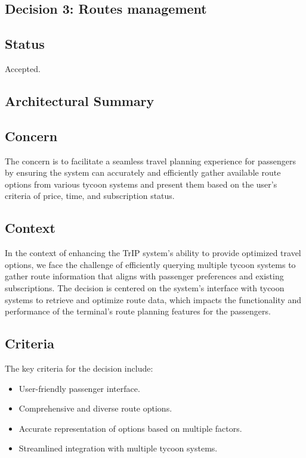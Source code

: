 \subsection{Decision 3: Routes management}

\subsection*{Status}
Accepted.

\subsection*{Architectural Summary}

\subsection*{Concern}
The concern is to facilitate a seamless travel planning experience for passengers by ensuring the system can accurately and efficiently gather available route options from various tycoon systems and present them based on the user's criteria of price, time, and subscription status.

\subsection*{Context}
In the context of enhancing the TrIP system's ability to provide optimized travel options, we face the challenge of efficiently querying multiple tycoon systems to gather route information that aligns with passenger preferences and existing subscriptions.
The decision is centered on the system's interface with tycoon systems to retrieve and optimize route data, which impacts the functionality and performance of the terminal's route planning features for the passengers.

\subsection*{Criteria}
The key criteria for the decision include:
\begin{itemize}
    \item User-friendly passenger interface.
    \item Comprehensive and diverse route options.
    \item Accurate representation of options based on multiple factors.
    \item Streamlined integration with multiple tycoon systems.
\end{itemize}

